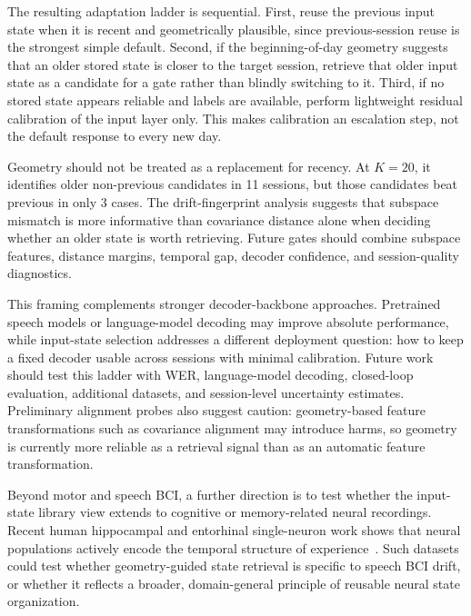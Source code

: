\documentclass{article}
\begin{document}
The resulting adaptation ladder is sequential. First, reuse the previous input state when it is recent and geometrically plausible, since previous-session reuse is the strongest simple default. Second, if the beginning-of-day geometry suggests that an older stored state is closer to the target session, retrieve that older input state as a candidate for a gate rather than blindly switching to it. Third, if no stored state appears reliable and labels are available, perform lightweight residual calibration of the input layer only. This makes calibration an escalation step, not the default response to every new day.

Geometry should not be treated as a replacement for recency. At $K=20$, it identifies older non-previous candidates in 11 sessions, but those candidates beat previous in only 3 cases. The drift-fingerprint analysis suggests that subspace mismatch is more informative than covariance distance alone when deciding whether an older state is worth retrieving. Future gates should combine subspace features, distance margins, temporal gap, decoder confidence, and session-quality diagnostics.

This framing complements stronger decoder-backbone approaches. Pretrained speech models or language-model decoding may improve absolute performance, while input-state selection addresses a different deployment question: how to keep a fixed decoder usable across sessions with minimal calibration. Future work should test this ladder with WER, language-model decoding, closed-loop evaluation, additional datasets, and session-level uncertainty estimates. Preliminary alignment probes also suggest caution: geometry-based feature transformations such as covariance alignment may introduce harms, so geometry is currently more reliable as a retrieval signal than as an automatic feature transformation.

Beyond motor and speech BCI, a further direction is to test whether the input-state library view extends to cognitive or memory-related neural recordings. Recent human hippocampal and entorhinal single-neuron work shows that neural populations actively encode the temporal structure of experience~\cite{tacikowski2024human}. Such datasets could test whether geometry-guided state retrieval is specific to speech BCI drift, or whether it reflects a broader, domain-general principle of reusable neural state organization.
\end{document}
